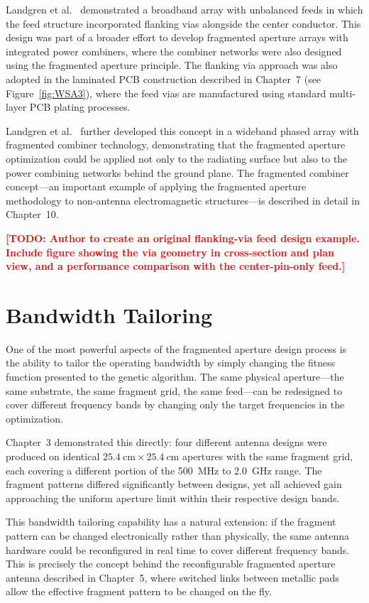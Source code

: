 Landgren et al.\ \cite{Landgren2019Broadband} demonstrated a broadband array with unbalanced feeds in which the feed structure incorporated flanking vias alongside the center conductor.  This design was part of a broader effort to develop fragmented aperture arrays with integrated power combiners, where the combiner networks were also designed using the fragmented aperture principle.  The flanking via approach was also adopted in the laminated PCB construction described in Chapter~7 (see Figure~\ref{fig:WSA3}), where the feed vias are manufactured using standard multi-layer PCB plating processes.

Landgren et al.\ \cite{Landgren2018Combiner} further developed this concept in a wideband phased array with fragmented combiner technology, demonstrating that the fragmented aperture optimization could be applied not only to the radiating surface but also to the power combining networks behind the ground plane.  The fragmented combiner concept---an important example of applying the fragmented aperture methodology to non-antenna electromagnetic structures---is described in detail in Chapter~10.

\textcolor{red}{\textbf{[TODO: Author to create an original flanking-via feed design example.  Include figure showing the via geometry in cross-section and plan view, and a performance comparison with the center-pin-only feed.]}}

\section{Bandwidth Tailoring}
\label{sec:ch4bw}

One of the most powerful aspects of the fragmented aperture design process is the ability to tailor the operating bandwidth by simply changing the fitness function presented to the genetic algorithm.  The same physical aperture---the same substrate, the same fragment grid, the same feed---can be redesigned to cover different frequency bands by changing only the target frequencies in the optimization.

Chapter~3 demonstrated this directly: four different antenna designs were produced on identical $25.4~\text{cm} \times 25.4~\text{cm}$ apertures with the same fragment grid, each covering a different portion of the 500~MHz to 2.0~GHz range.  The fragment patterns differed significantly between designs, yet all achieved gain approaching the uniform aperture limit within their respective design bands.

This bandwidth tailoring capability has a natural extension: if the fragment pattern can be changed electronically rather than physically, the same antenna hardware could be reconfigured in real time to cover different frequency bands.  This is precisely the concept behind the reconfigurable fragmented aperture antenna described in Chapter~5, where switched links between metallic pads allow the effective fragment pattern to be changed on the fly.

